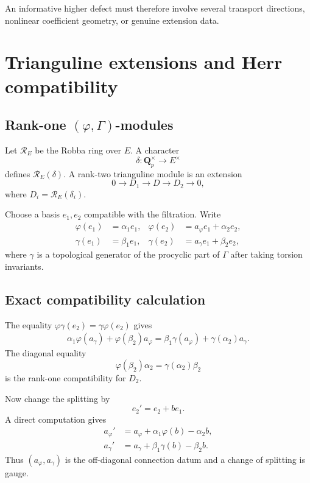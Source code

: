\documentclass[11pt]{article}
\theoremstyle{definition}
\newcommand{\Qp}{\mathbf Q_p}
\newcommand{\cR}{\mathcal R}
\begin{document}
An informative higher defect must therefore involve several transport directions, nonlinear coefficient geometry, or genuine extension data.

\section{Trianguline extensions and Herr compatibility}

\subsection{Rank-one \texorpdfstring{$(\varphi,\Gamma)$}{(phi,Gamma)}-modules}

Let $\cR_E$ be the Robba ring over $E$.  A character
\[
\delta:\Qp^\times\longrightarrow E^\times
\]
defines $\cR_E(\delta)$.  A rank-two trianguline module is an extension \cite{ColmezTrianguline,BergerTrianguline}
\begin{equation}\label{eq:trianguline-extension}
0\longrightarrow D_1\longrightarrow D\longrightarrow D_2\longrightarrow0,
\end{equation}
where $D_i=\cR_E(\delta_i)$.

Choose a basis $e_1,e_2$ compatible with the filtration.  Write
\begin{align}
\varphi(e_1)&=\alpha_1e_1,
&\varphi(e_2)&=a_\varphi e_1+\alpha_2e_2,\label{eq:phi-matrix}\\
\gamma(e_1)&=\beta_1e_1,
&\gamma(e_2)&=a_\gamma e_1+\beta_2e_2,\label{eq:gamma-matrix}
\end{align}
where $\gamma$ is a topological generator of the procyclic part of $\Gamma$ after taking torsion invariants.

\subsection{Exact compatibility calculation}

The equality $\varphi\gamma(e_2)=\gamma\varphi(e_2)$ gives
\begin{align}
\alpha_1\varphi(a_\gamma)+\varphi(\beta_2)a_\varphi
=
\beta_1\gamma(a_\varphi)+\gamma(\alpha_2)a_\gamma.
\label{eq:extension-compatibility}
\end{align}
The diagonal equality
\[
\varphi(\beta_2)\alpha_2=\gamma(\alpha_2)\beta_2
\]
is the rank-one compatibility for $D_2$.

Now change the splitting by
\[
e_2'=e_2+b e_1.
\]
A direct computation gives
\begin{align}
 a_\varphi'&=a_\varphi+\alpha_1\varphi(b)-\alpha_2b,\label{eq:gauge-phi}\\
 a_\gamma'&=a_\gamma+\beta_1\gamma(b)-\beta_2b.\label{eq:gauge-gamma}
\end{align}
Thus $(a_\varphi,a_\gamma)$ is the off-diagonal connection datum and a change of splitting is gauge.
\end{document}
